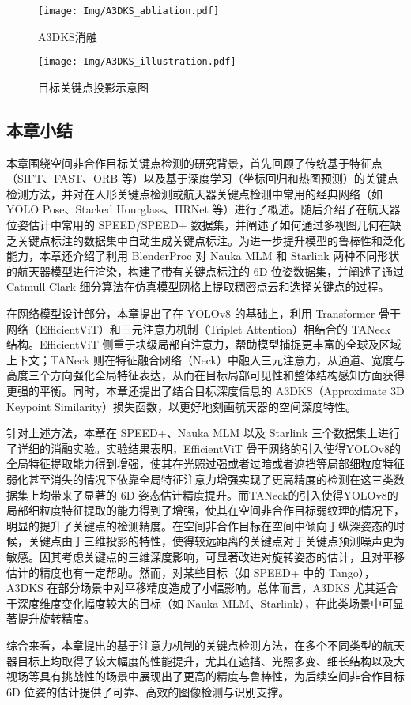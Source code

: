 \begin{figure}[htbp]
	\centering
	\texttt{[image: Img/A3DKS\_abliation.pdf]}
	\caption{A3DKS消融}
	\label{fig:A3DKS}
	\vspace{-3ex}
\end{figure}

\begin{figure}[htbp]
	\centering
	\texttt{[image: Img/A3DKS\_illustration.pdf]}
	\caption{目标关键点投影示意图}
	\label{fig:A3DKS_illustration}
	\vspace{-3ex}
\end{figure}







\subsection{本章小结}
本章围绕空间非合作目标关键点检测的研究背景，首先回顾了传统基于特征点（SIFT、FAST、ORB 等）以及基于深度学习（坐标回归和热图预测）的关键点检测方法，并对在人形关键点检测或航天器关键点检测中常用的经典网络（如 YOLO Pose、Stacked Hourglass、HRNet 等）进行了概述。随后介绍了在航天器位姿估计中常用的 SPEED/SPEED+ 数据集，并阐述了如何通过多视图几何在缺乏关键点标注的数据集中自动生成关键点标注。为进一步提升模型的鲁棒性和泛化能力，本章还介绍了利用 BlenderProc 对 Nauka MLM 和 Starlink 两种不同形状的航天器模型进行渲染，构建了带有关键点标注的 6D 位姿数据集，并阐述了通过 Catmull-Clark 细分算法在仿真模型网格上提取稠密点云和选择关键点的过程。

在网络模型设计部分，本章提出了在 YOLOv8 的基础上，利用 Transformer 骨干网络（EfficientViT）和三元注意力机制（Triplet Attention）相结合的 TANeck 结构。EfficientViT 侧重于块级局部自注意力，帮助模型捕捉更丰富的全球及区域上下文；TANeck 则在特征融合网络（Neck）中融入三元注意力，从通道、宽度与高度三个方向强化全局特征表达，从而在目标局部可见性和整体结构感知方面获得更强的平衡。同时，本章还提出了结合目标深度信息的 A3DKS（Approximate 3D Keypoint Similarity）损失函数，以更好地刻画航天器的空间深度特性。

针对上述方法，本章在 SPEED+、Nauka MLM 以及 Starlink 三个数据集上进行了详细的消融实验。实验结果表明，EfficientViT 骨干网络的引入使得YOLOv8的全局特征提取能力得到增强，使其在光照过强或者过暗或者遮挡等局部细粒度特征弱化甚至消失的情况下依靠全局特征注意力增强实现了更高精度的检测在这三类数据集上均带来了显著的 6D 姿态估计精度提升。而TANeck的引入使得YOLOv8的局部细粒度特征提取的能力得到了增强，使其在空间非合作目标弱纹理的情况下，明显的提升了关键点的检测精度。在空间非合作目标在空间中倾向于纵深姿态的时候，关键点由于三维投影的特性，使得较远距离的关键点对于关键点预测噪声更为敏感。因其考虑关键点的三维深度影响，可显著改进对旋转姿态的估计，且对平移估计的精度也有一定帮助。然而，对某些目标（如 SPEED+ 中的 Tango），A3DKS 在部分场景中对平移精度造成了小幅影响。总体而言，A3DKS 尤其适合于深度维度变化幅度较大的目标（如 Nauka MLM、Starlink），在此类场景中可显著提升旋转精度。

综合来看，本章提出的基于注意力机制的关键点检测方法，在多个不同类型的航天器目标上均取得了较大幅度的性能提升，尤其在遮挡、光照多变、细长结构以及大视场等具有挑战性的场景中展现出了更高的精度与鲁棒性，为后续空间非合作目标 6D 位姿的估计提供了可靠、高效的图像检测与识别支撑。
